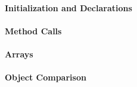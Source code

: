 \paragraph{Initialization and Declarations}
\begin{itemize}
\end{itemize}

\paragraph{Method Calls}
\begin{itemize}
\end{itemize}

\paragraph{Arrays}
\begin{itemize}
\end{itemize}

\paragraph{Object Comparison}
\begin{itemize}
\end{itemize}

